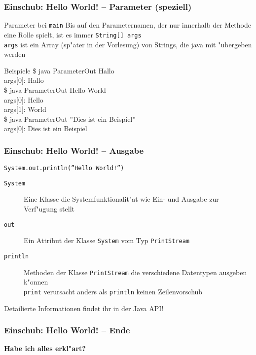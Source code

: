 \documentclass{beamer}
\begin{document}
\begin{frame}
\frametitle{Einschub: Hello World! -- Parameter (speziell)}
\begin{block}{Parameter bei \texttt{main}}
Bis auf den Parameternamen, der nur innerhalb der Methode eine Rolle spielt, ist es immer \texttt{String[] args}\\
\texttt{args} ist ein Array (sp"ater in der Vorlesung) von Strings, die java mit "ubergeben werden
\end{block}

\pause

\begin{block}{Beispiele}
\ttfamily
\$ java ParameterOut Hallo\\
args[0]: Hallo\\[0.5em]
\$ java ParameterOut Hello World\\
args[0]: Hello\\
args[1]: World\\[0.5em]
\$ java ParameterOut \textrm{''}Dies ist ein Beispiel\textrm{''}\\
args[0]: Dies ist ein Beispiel
\end{block}
\end{frame}


\begin{frame}
\frametitle{Einschub: Hello World! -- Ausgabe}
\begin{block}{\texttt{System.out.println(\textrm{''}Hello World!\textrm{''})}}
\begin{description}
\item[\texttt{System}] Eine Klasse die Systemfunktionalit"at wie Ein- und Ausgabe zur Verf"ugung stellt\\
\item[\texttt{out}] Ein Attribut der Klasse \texttt{System} vom Typ \texttt{PrintStream}\\
\item[\texttt{println}] Methoden der Klasse \texttt{PrintStream} die verschiedene Datentypen ausgeben k"onnen\\ \texttt{print} verursacht anders als \texttt{println} keinen Zeilenvorschub
\end{description}
\alert{Detailierte Informationen findet ihr in der Java API!}
\end{block}
\end{frame}


\begin{frame}
\frametitle{Einschub: Hello World! -- Ende}

\begin{center}
\textbf{\Huge Habe ich alles erkl"art?}
\end{center}
\end{frame}
\end{document}
